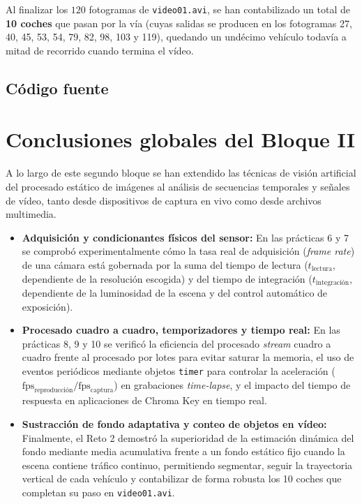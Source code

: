 \documentclass[12pt,a4paper]{article}
\newcommand{\numbloque}{II}
\begin{document}
	Al finalizar los $120$ fotogramas de \texttt{video01.avi}, se han contabilizado un total de \textbf{10 coches} que pasan por la vía (cuyas salidas se producen en los fotogramas 27, 40, 45, 53, 54, 79, 82, 98, 103 y 119), quedando un undécimo vehículo todavía a mitad de recorrido cuando termina el vídeo.
	
	\subsection{Código fuente}
	
	
	\clearpage
	
	\section{Conclusiones globales del Bloque \numbloque}
	
	A lo largo de este segundo bloque se han extendido las técnicas de visión artificial del procesado estático de imágenes al análisis de secuencias temporales y señales de vídeo, tanto desde dispositivos de captura en vivo como desde archivos multimedia.
	
	\begin{itemize}[leftmargin=1.5em]
		\item \textbf{Adquisición y condicionantes físicos del sensor:} En las prácticas 6 y 7 se comprobó experimentalmente cómo la tasa real de adquisición (\textit{frame rate}) de una cámara está gobernada por la suma del tiempo de lectura ($t_{\text{lectura}}$, dependiente de la resolución escogida) y del tiempo de integración ($t_{\text{integración}}$, dependiente de la luminosidad de la escena y del control automático de exposición).
		\item \textbf{Procesado cuadro a cuadro, temporizadores y tiempo real:} En las prácticas 8, 9 y 10 se verificó la eficiencia del procesado \textit{stream} cuadro a cuadro frente al procesado por lotes para evitar saturar la memoria, el uso de eventos periódicos mediante objetos \texttt{timer} para controlar la aceleración ($\text{fps}_{\text{reproducción}} / \text{fps}_{\text{captura}}$) en grabaciones \textit{time-lapse}, y el impacto del tiempo de respuesta en aplicaciones de Chroma Key en tiempo real.
		\item \textbf{Sustracción de fondo adaptativa y conteo de objetos en vídeo:} Finalmente, el Reto 2 demostró la superioridad de la estimación dinámica del fondo mediante media acumulativa frente a un fondo estático fijo cuando la escena contiene tráfico continuo, permitiendo segmentar, seguir la trayectoria vertical de cada vehículo y contabilizar de forma robusta los 10 coches que completan su paso en \texttt{video01.avi}.
	\end{itemize}
	
\end{document}
